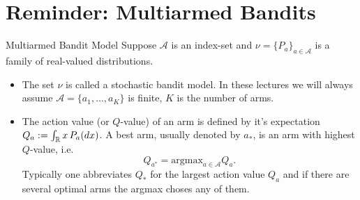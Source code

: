 \section{Reminder: Multiarmed Bandits}
\begin{frame}
    \begin{ldef}{Multiarmed Bandit Model}
            Suppose $\mathcal A$ is an index-set and $\nu = \{P_a\}_{a \in \mathcal A}$ is a family of real-valued distributions. 
            \begin{itemize}
                \item The set $\nu$ is called a stochastic bandit model. In these lectures we will always assume $\mathcal A=\{a_1,...,a_K\}$ is finite, $K$ is the number of arms.
                \item The action value (or $Q$-value) of an arm is defined by it's expectation $Q_a:=\int_{\mathbb{R}} x \, P_{a}(dx)$. A best arm, usually denoted by $a_*$, is an arm with highest $Q$-value, i.e.         
                 $$Q_{a^*}=\text{argmax}_{a\in \mathcal A} Q_a.$$ Typically one abbreviates $Q_*$ for the largest action value $Q_a$ and if there are several optimal arms the argmax choses any of them.
            \end{itemize}
\end{ldef}
\end{frame}

